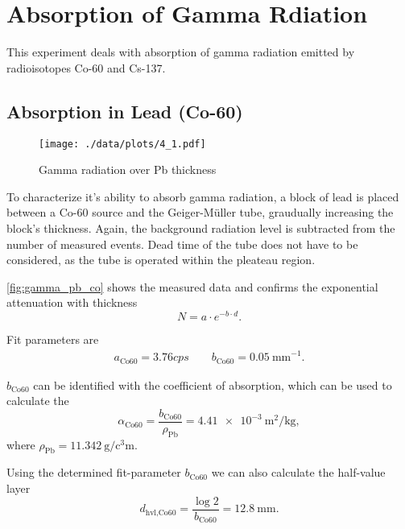 \chapter{Absorption of Gamma Rdiation}
This experiment deals with absorption of gamma radiation emitted by radioisotopes Co-60 and Cs-137.

\section{Absorption in Lead (Co-60)}\label{sec:co}
\begin{figure}[ht!]
	\centering
	\texttt{[image: ./data/plots/4\_1.pdf]}
	\caption[Gamma radiation over Pb thickness]{Gamma radiation over Pb thickness}
	\label{fig:gamma_pb_co}
\end{figure}
To characterize it's ability to absorb gamma radiation, a block of lead is placed between a Co-60 source and the Geiger-Müller tube, graudually increasing the block's thickness.
Again, the background radiation level is subtracted from the number of measured events.
Dead time of the tube does not have to be considered, as the tube is operated within the pleateau region.

\autoref{fig:gamma_pb_co} shows the measured data and confirms the exponential attenuation with thickness
\begin{equation*}
	N = a \cdot e^{-b \cdot d}.
\end{equation*}

Fit parameters are
\begin{gather*}
	a_\text{Co60}=\num{3.76}cps\qquad b_\text{Co60}=\SI{0.05}{\milli\meter}^{-1}.
\end{gather*}

$b_\text{Co60}$ can be identified with the coefficient of absorption, which can be used to calculate the 
\begin{equation*}
	\alpha_\text{Co60}=\frac{b_\text{Co60}}{\rho_\text{Pb}}=\SI{4.41e-3}{\meter\squared\per\kilogram},
\end{equation*}
where $\rho_\text{Pb}=\SI{11.342}{\gram\per\cubic\centi\meter}$.

Using the determined fit-parameter $b_\text{Co60}$ we can also calculate the half-value layer
\begin{equation*}
	d_\text{hvl,Co60}=\frac{\log{2}}{b_\text{Co60}}=\SI{12.8}{\milli\meter}.
\end{equation*}

